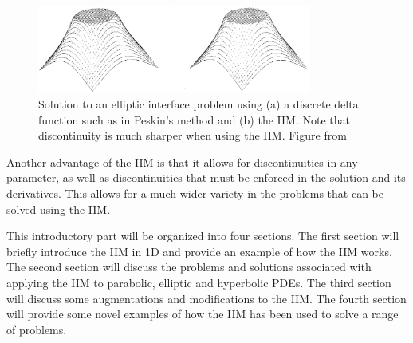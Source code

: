 \begin{figure}[b]
    \centerline{\includegraphics[width=0.8\textwidth]{diagrams/LevequeLiComparison.eps}}
    \vskip0.5cm
    \caption{Solution to an elliptic interface problem using (a) a discrete delta function such as in Peskin's method and (b) the IIM. Note that discontinuity is much sharper when using the IIM. Figure from \cite{levequeli94}}
    \label{fig:one}
\end{figure}

Another advantage of the IIM is that it allows for discontinuities in any parameter, as well as discontinuities that must be enforced in the solution and its derivatives. 
This allows for a much wider variety in the problems that can be solved using the IIM.

This introductory part will be organized into four sections.
The first section will briefly introduce the IIM in 1D and provide an example of how the IIM works.
The second section will discuss the problems and solutions associated with applying the IIM to parabolic, elliptic and hyperbolic PDEs.
The third section will discuss some augmentations and modifications to the IIM. 
The fourth section will provide some novel examples of how the IIM has been used to solve a range of problems.
